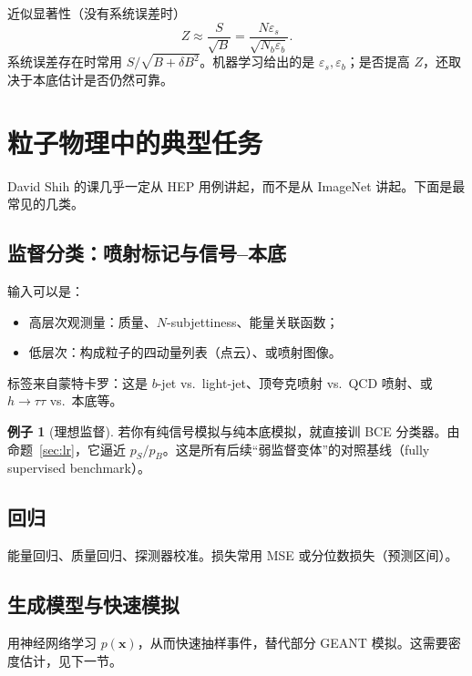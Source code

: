 \documentclass[11pt,a4paper]{article}
\theoremstyle{definition}
\newtheorem{example}{例子}[section]
\theoremstyle{plain}
\theoremstyle{remark}
\begin{document}
近似显著性（没有系统误差时）
\begin{equation}
  Z\approx\frac{S}{\sqrt{B}}=\frac{N\varepsilon_s}{\sqrt{N_b\varepsilon_b}}.
\end{equation}
系统误差存在时常用 $S/\sqrt{B+\delta B^2}$。机器学习给出的是 $\varepsilon_s,\varepsilon_b$；是否提高 $Z$，还取决于本底估计是否仍然可靠。

\section{粒子物理中的典型任务}
\label{sec:hep}

David Shih 的课几乎一定从 HEP 用例讲起，而不是从 ImageNet 讲起。下面是最常见的几类。

\subsection{监督分类：喷射标记与信号--本底}

输入可以是：
\begin{itemize}[leftmargin=1.4em]
  \item 高层次观测量：质量、$N$-subjettiness、能量关联函数；
  \item 低层次：构成粒子的四动量列表（点云）、或喷射图像。
\end{itemize}
标签来自蒙特卡罗：这是 $b$-jet vs.\ light-jet、顶夸克喷射 vs.\ QCD 喷射、或 $h\to\tau\tau$ vs.\ 本底等。

\begin{example}[理想监督]
若你有纯信号模拟与纯本底模拟，就直接训 BCE 分类器。由命题~\ref{sec:lr}，它逼近 $p_S/p_B$。这是所有后续``弱监督变体''的对照基线（fully supervised benchmark）。
\end{example}

\subsection{回归}

能量回归、质量回归、探测器校准。损失常用 MSE 或分位数损失（预测区间）。

\subsection{生成模型与快速模拟}

用神经网络学习 $p(\mathbf{x})$，从而快速抽样事件，替代部分 GEANT 模拟。这需要密度估计，见下一节。
\end{document}

